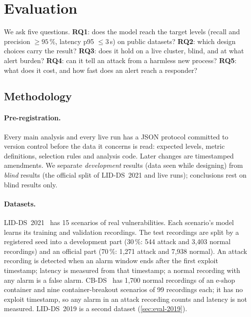\section{Evaluation}\label{sec:evaluation}

We ask five questions. \textbf{RQ1}: does the model reach the target levels (recall and precision $\ge 95\,\%$, latency
p95 $\le 3$\,s) on public datasets? \textbf{RQ2}: which design choices carry the result? \textbf{RQ3}: does it hold on a
live cluster, blind, and at what alert burden? \textbf{RQ4}: can it tell an attack from a harmless new process?
\textbf{RQ5}: what does it cost, and how fast does an alert reach a responder?

\subsection{Methodology}\label{sec:eval-method}

\paragraph{Pre-registration.} Every main analysis and every live run has a JSON protocol committed to version control
before the data it concerns is read: expected levels, metric definitions, selection rules and analysis code. Later
changes are timestamped amendments. We separate \emph{development} results (data seen while designing) from
\emph{blind} results (the official split of LID-DS~2021 and live runs); conclusions rest on blind results only.

\paragraph{Datasets.} LID-DS~2021~\cite{grimmer2022} has 15 scenarios of real vulnerabilities. Each scenario's model
learns its training and validation recordings. The test recordings are split by a registered seed into a development
part (30\,\%: 544 attack and 3{,}403 normal recordings) and an official part (70\,\%: 1{,}271 attack and 7{,}938
normal). An attack recording is detected when an alarm window ends after the first exploit timestamp; latency is
measured from that timestamp; a normal recording with any alarm is a false alarm. CB-DS~\cite{elkhairi2022} has 1{,}700
normal recordings of an e-shop container and nine container-breakout scenarios of 99 recordings each; it has no exploit
timestamp, so any alarm in an attack recording counts and latency is not measured. LID-DS~2019 is a second dataset
(\cref{sec:eval-2019}).

